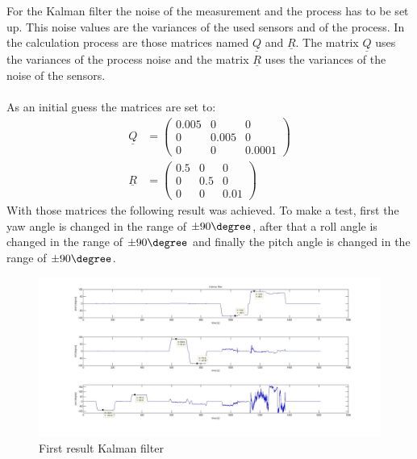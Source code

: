 For the Kalman filter the noise of the measurement and the process has to be set up. This noise values are the variances of the used sensors and of the process. In the calculation process are those matrices named $\underline Q$ and $\underline R$. The matrix $\underline Q$ uses the variances of the process noise and the matrix $\underline R$ uses the variances of the noise of the sensors.\\\\
As an initial guess the matrices are set to:
\begin{align}
\underline{Q} &= \begin{pmatrix} 0.005&0&0 \\ 0&0.005&0 \\ 0&0&0.0001 \end{pmatrix}\\
\underline{R} &= \begin{pmatrix} 0.5&0&0 \\ 0&0.5&0 \\ 0&0&0.01 \end{pmatrix}
\end{align}
With those matrices the following result was achieved. To make a test, first the yaw angle is changed in the range of $\pm90 \degree$, after that a roll angle is changed in the range of $\pm90 \degree$ and finally the pitch angle is changed in the range of $\pm90 \degree$. 

\begin{figure}[H]
	\centering\includegraphics[width=1.0\textwidth]{fig/Res_Kal_Comp/initial_Kalman}
	\caption{First result Kalman filter}
	\label{fig:initial_Kalman}
\end{figure}

